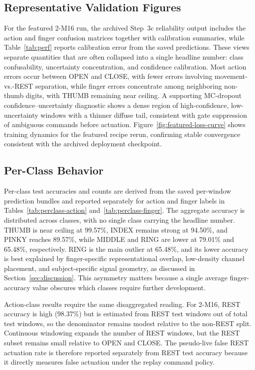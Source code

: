 \documentclass[conference]{IEEEtran}
\begin{document}


\subsection{Representative Validation Figures}
For the featured 2-M16 run, the archived Step~3c reliability output includes the action and finger confusion matrices together with calibration summaries, while Table~\ref{tab:perf} reports calibration error from the saved predictions. These views separate quantities that are often collapsed into a single headline number: class confusability, uncertainty concentration, and confidence calibration. Most action errors occur between OPEN and CLOSE, with fewer errors involving movement-vs.-REST separation, while finger errors concentrate among neighboring non-thumb digits, with THUMB remaining near ceiling. A supporting MC-dropout confidence--uncertainty diagnostic shows a dense region of high-confidence, low-uncertainty windows with a thinner diffuse tail, consistent with gate suppression of ambiguous commands before actuation. Figure~\ref{fig:featured-loss-curve} shows training dynamics for the featured recipe rerun, confirming stable convergence consistent with the archived deployment checkpoint.



\subsection{Per-Class Behavior}
Per-class test accuracies and counts are derived from the saved per-window prediction bundles and reported separately for action and finger labels in Tables~\ref{tab:perclass-action} and~\ref{tab:perclass-finger}. The aggregate accuracy is distributed across classes, with no single class carrying the headline number. THUMB is near ceiling at 99.57\%, INDEX remains strong at 94.50\%, and PINKY reaches 89.57\%, while MIDDLE and RING are lower at 79.01\% and 65.48\%, respectively. RING is the main outlier at 65.48\%, and its lower accuracy is best explained by finger-specific representational overlap, low-density channel placement, and subject-specific signal geometry, as discussed in Section~\ref{sec:discussion}. This asymmetry matters because a single average finger-accuracy value obscures which classes require further development.



Action-class results require the same disaggregated reading. For 2-M16, REST accuracy is high (98.37\%) but is estimated from \FeaturedNRest{} REST test windows out of \FeaturedNTest{} total test windows, so the denominator remains modest relative to the non-REST split. Continuous windowing expands the number of REST windows, but the REST subset remains small relative to OPEN and CLOSE. The pseudo-live false REST actuation rate is therefore reported separately from REST test accuracy because it directly measures false actuation under the replay command policy.
\end{document}

